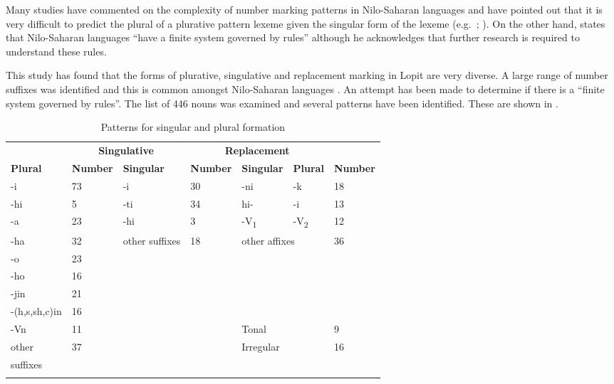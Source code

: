 \documentclass[output=paper]{langsci/langscibook}
\begin{document}
Many studies have commented on the complexity of number marking patterns in Nilo-Saharan languages and have pointed out that it is very difficult to predict the plural of a plurative pattern lexeme given the singular form of the lexeme (e.g.\ \citealt[4]{TuckerMpaayei1955}; \citealt[3]{HildersLawrance1957}). On the other hand, \citet[255]{Dimmendaal2000} states that Nilo-Saharan languages “have a finite system governed by rules” although he acknowledges that further research is required to understand these rules. 

This study has found that the forms of plurative, singulative and replacement marking in Lopit are very diverse. A large range of number suffixes was identified and this is common amongst Nilo-Saharan languages \citep[219]{Dimmendaal2000}. An attempt has been made to determine if there is a “finite system governed by rules”. The list of 446 nouns was examined and several patterns have been identified. These are shown in . 

\begin{table}
\begin{tabularx}{\textwidth}{lXXXXXX}
\lsptoprule

\multicolumn{2}{c}{ \textbf{Plurative}} & \multicolumn{2}{c}{ \textbf{Singulative}} & \multicolumn{3}{c}{ \textbf{Replacement}}\\\cmidrule(lr){1-2}\cmidrule(lr){3-4}\cmidrule(lr){5-7}
 \textbf{Plural} & \textbf{Number} & \textbf{Singular} & \textbf{Number} & \textbf{Singular} & \textbf{Plural} & \textbf{Number}\\ \midrule
 {}-i & 73 &  {}-i & 30 &  {}-ni &  {}-k & 18\\
 {}-hi & 5 &  {}-ti & 34 &  hi- &  {}-i & 13\\
 {}-a & 23 &  {}-hi & 3 & {}-{V}{\textsubscript{1}} &  {}-V\textsubscript{2} & 12\\
 {}-ha & 32 & other suffixes & 18 & \multicolumn{2}{l}{other affixes} & 36\\
 {}-o & 23 &  &  &  &  & \\
 {}-ho & 16 &  &  &  &  & \\
 {}-jin & 21 &  &  &  &  & \\
 {}-(h,s,sh,c)in & 16 &  &  &  &  & \\
\hhline{~~~~---}
 {}-Vn & 11 &  &  & Tonal &  & 9\\
other & 37 &  &  & Irregular &  & 16\\
suffixes & & & & & & \\
\lspbottomrule
\end{tabularx}
\caption{Patterns for singular and plural formation}
\label{tab:moodie:9}
\end{table}
\end{document}
